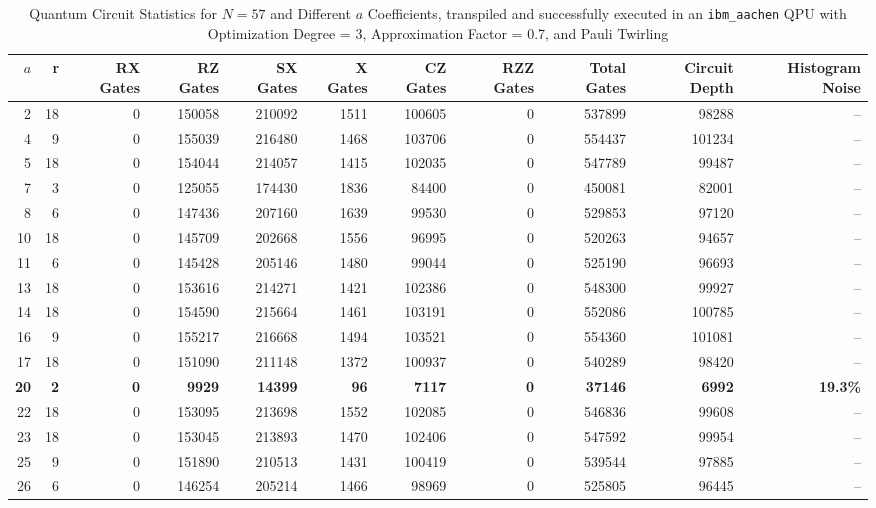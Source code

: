 \documentclass[conference,twoside]{IEEEtran}
\begin{document}
\begin{table}[h]
\centering
\caption{Quantum Circuit Statistics for $N=57$ and Different $a$ Coefficients, transpiled and successfully executed in an \texttt{ibm\_aachen} QPU with Optimization Degree = 3, Approximation Factor = 0.7, and Pauli Twirling}
\label{tab:QC_statistics_N=57_all_a}
\begin{tabular}{rrrrrrrrrrr}
\toprule
{$a$} & r & {RX Gates} & {RZ Gates} & {SX Gates} & {X Gates} & {CZ Gates} & {RZZ Gates} & {Total Gates} & {Circuit Depth} & {Histogram Noise} \\
\midrule
2 & 18 & 0 & 150058 & 210092 & 1511 & 100605 & 0 & 537899 & 98288 & -- \\
4 &  9 & 0 & 155039 & 216480 & 1468 & 103706 & 0 & 554437 & 101234 & --  \\
5 &  18 & 0 & 154044 & 214057 & 1415 & 102035 & 0 & 547789 & 99487 & --  \\
7 &  3 & 0 & 125055 & 174430 & 1836 & 84400  & 0 & 450081 & 82001 & --  \\
8 &  6 & 0 & 147436 & 207160 & 1639 & 99530  & 0 & 529853 & 97120 & --  \\
10 &  18 & 0 & 145709 & 202668 & 1556 & 96995  & 0 & 520263 & 94657 & -- \\
11 &  6 & 0 & 145428 & 205146 & 1480 & 99044  & 0 & 525190 & 96693 & -- \\
13 & 18  & 0 & 153616 & 214271 & 1421 & 102386 & 0 & 548300 & 99927 & -- \\
14 & 18  & 0 & 154590 & 215664 & 1461 & 103191 & 0 & 552086 & 100785 & -- \\
16 & 9  & 0 & 155217 & 216668 & 1494 & 103521 & 0 & 554360 & 101081 & -- \\
17 & 18  & 0 & 151090 & 211148 & 1372 & 100937 & 0 & 540289 & 98420 & -- \\
\textbf{20} & \textbf{2} & \textbf{0} & \textbf{9929}   & \textbf{14399}  & \textbf{96}   & \textbf{7117}   & \textbf{0} & \textbf{37146}  & \textbf{6992} & \textbf{19.3\%} \\
22 &  18 & 0 & 153095 & 213698 & 1552 & 102085 & 0 & 546836 & 99608 & -- \\
23 &  18 & 0 & 153045 & 213893 & 1470 & 102406 & 0 & 547592 & 99954 & -- \\
25 &  9 & 0 & 151890 & 210513 & 1431 & 100419 & 0 & 539544 & 97885 & -- \\
26 & 6 & 0 & 146254 & 205214 & 1466 & 98969  & 0 & 525805 & 96445 & -- \\

\end{tabular}
\end{table}
\end{document}
